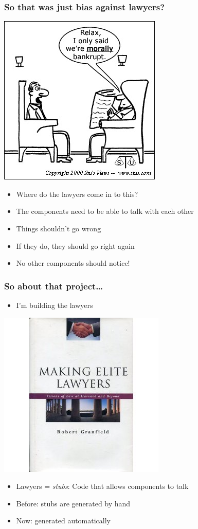 \documentclass[bigger]{beamer}
\begin{document}
\begin{frame}
\frametitle{So that was just bias against lawyers?}
\label{sec-6}

\includegraphics[scale=0.25]{../pictures/morally_bankrupt.jpg}
\begin{itemize}
\item Where do the lawyers come in to this?
\item The components need to be able to talk with each other
\item Things shouldn't go wrong
\item If they do, they should go right again
\item No other components should notice!
\end{itemize}
\end{frame}
\begin{frame}
\frametitle{So about that project\ldots{}}
\label{sec-7}

\begin{itemize}
\item I'm building the lawyers
\end{itemize}
\includegraphics[scale=0.35]{../pictures/building_lawyers.jpg}
\begin{itemize}
\item Lawyers = \emph{stubs}: Code that allows components to talk
\item Before: stubs are generated by hand
\item Now: generated automatically
\end{itemize}
\end{frame}
\end{document}
